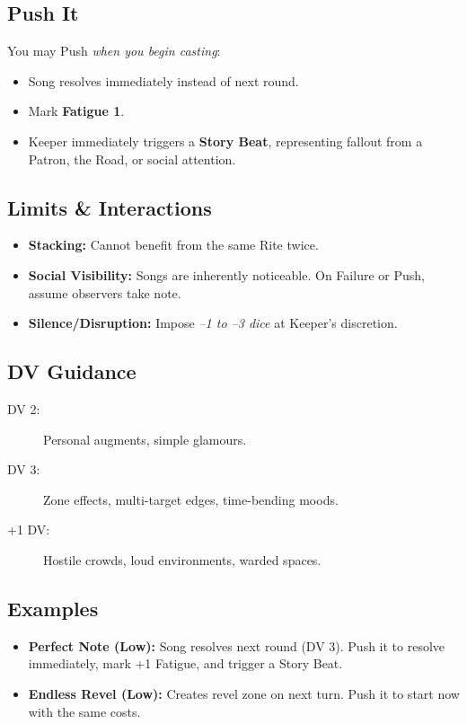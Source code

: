 \subsection*{Push It}
You may Push \emph{when you begin casting}:
\begin{itemize}
\item Song resolves immediately instead of next round.
\item Mark \textbf{Fatigue 1}.
\item Keeper immediately triggers a \textbf{Story Beat}, representing fallout from a Patron, the Road, or social attention.
\end{itemize}

\subsection*{Limits \& Interactions}
\begin{itemize}
\item \textbf{Stacking:} Cannot benefit from the same Rite twice.
\item \textbf{Social Visibility:} Songs are inherently noticeable. On Failure or Push, assume observers take note.
\item \textbf{Silence/Disruption:} Impose \emph{–1 to –3 dice} at Keeper’s discretion.
\end{itemize}

\subsection*{DV Guidance}
\label{talent:cantors-path-dv}
\begin{description}
\item[DV 2:] Personal augments, simple glamours.
\item[DV 3:] Zone effects, multi-target edges, time-bending moods.
\item[+1 DV:] Hostile crowds, loud environments, warded spaces.
\end{description}

\subsection*{Examples}
\begin{itemize}
\item \textbf{Perfect Note (Low):} Song resolves next round (DV 3). Push it to resolve immediately, mark +1 Fatigue, and trigger a Story Beat.
\item \textbf{Endless Revel (Low):} Creates revel zone on next turn. Push it to start now with the same costs.
\end{itemize}

